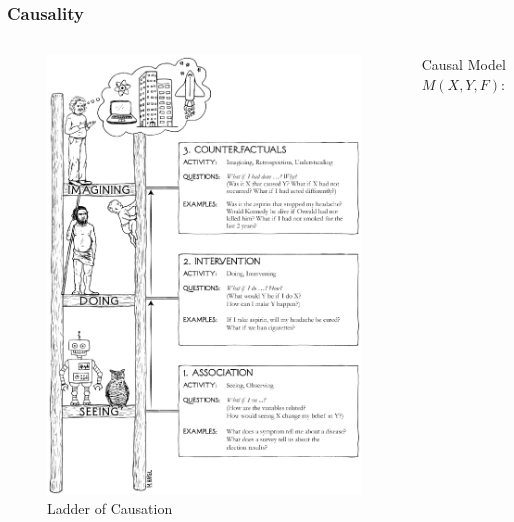 \documentclass[usenames,dvipsnames]{beamer}
\begin{document}
\begin{frame}
  \frametitle{Causality}
  \begin{columns}
    \begin{column}[t]{.48\textwidth}
      \begin{figure}[ht]
        \centering
        \vspace{-0.8cm}
        \hspace{-1.5cm}
        \includegraphics[height=0.8\textheight,keepaspectratio]{figures/ladder_of_causation.png}
        \caption*{\tiny{Ladder of Causation~\parencite{JudeaPearl2018}}\label{fig:ladder-causation}}
      \end{figure}
    \end{column}
    \hspace{-2cm}
    \begin{column}[t]{.50\textwidth}
      Causal Model $M(X,Y,F)$:
      \begin{itemize}

\end{itemize}
\end{column}
\end{columns}
\end{frame}
\end{document}
